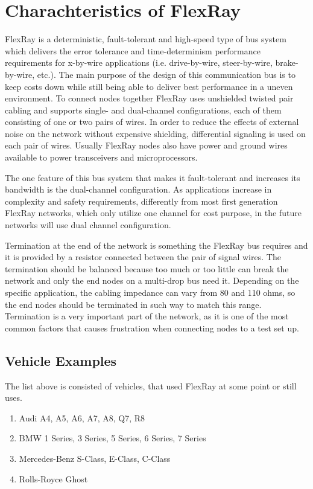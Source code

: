 \documentclass[conference]{IEEEtran}
\begin{document}
\section{Charachteristics of FlexRay}
FlexRay is a deterministic, fault-tolerant and high-speed type of bus system which delivers the error tolerance and time-determinism performance requirements for x-by-wire applications (i.e. drive-by-wire, steer-by-wire, brake-by-wire, etc.). The main purpose of the design of this communication bus is to keep costs down while still being able to deliver best performance in a uneven environment. To connect nodes together FlexRay uses unshielded twisted pair cabling and supports single- and dual-channel configurations, each of them consisting of one or two pairs of wires. In order to reduce the effects of external noise on the network without expensive shielding, differential signaling is used on each pair of wires. Usually FlexRay nodes also have power and ground wires available to power transceivers and microprocessors.

The one feature of this bus system that makes it fault-tolerant and increases its bandwidth is the dual-channel configuration. As applications increase in complexity and safety requirements, differently from most first generation FlexRay networks, which only utilize one channel for cost purpose, in the future networks will use dual channel configuration.

Termination at the end of the network is something the FlexRay bus requires and it is provided by a resistor connected between the pair of signal wires. The termination should be balanced because too much or too little can break the network and only the end nodes on a multi-drop bus need it. Depending on the specific application, the cabling impedance can vary from 80 and 110 ohms, so the end nodes should be terminated in such way to match this range. Termination is a very important part of the network, as it is one of the most common factors that causes frustration when connecting nodes to a test set up.\\

\subsection{Vehicle Examples}
The list above is consisted of vehicles, that used FlexRay at some point or still uses.\\
\begin{enumerate}
  \item Audi A4, A5, A6, A7, A8, Q7, R8\\
  
  \item BMW 1 Series, 3 Series, 5 Series, 6 Series, 7 Series\\
  
  \item Mercedes-Benz S-Class, E-Class, C-Class\\
  
  \item Rolls-Royce Ghost\\
  
\end{enumerate}
\end{document}
